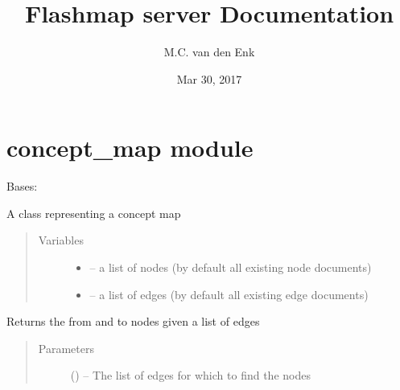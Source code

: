 \documentclass[letterpaper,10pt,english]{sphinxmanual}
\title{Flashmap server Documentation}
\date{Mar 30, 2017}
\author{M.C. van den Enk}
\begin{document}
\maketitle
\sphinxtableofcontents
{}\label{\detokenize{index::doc}}



\chapter{concept\_map module}
\label{\detokenize{concept_map:concept-map-module}}\label{\detokenize{concept_map::doc}}\label{\detokenize{concept_map:contents}}\label{\detokenize{concept_map:module-concept_map}}

\begin{fulllineitems}
\label{\detokenize{concept_map:concept_map.ConceptMap}}
Bases: 

A class representing a concept map
\begin{quote}\begin{description}
\item[{Variables}] \leavevmode\begin{itemize}
\item {} 
 -- a list of nodes (by default all existing node documents)

\item {} 
 -- a list of edges (by default all existing edge documents)

\end{itemize}

\end{description}\end{quote}

\begin{fulllineitems}
\label{\detokenize{concept_map:concept_map.ConceptMap.find_nodes}}
Returns the from and to nodes given a list of edges
\begin{quote}\begin{description}
\item[{Parameters}] \leavevmode
{} (\href{https://docs.python.org/2/library/functions.html\#list}{}\sphinxstyleliteralemphasis{)}\sphinxstyleliteralemphasis{}) -- The list of edges for which to find the nodes


\end{description}
\end{quote}
\end{fulllineitems}
\end{fulllineitems}
\end{document}
